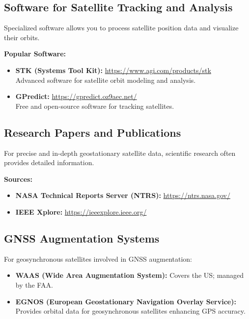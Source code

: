 \subsection{Software for Satellite Tracking and Analysis}
Specialized software allows you to process satellite position data and visualize their orbits.

\textbf{Popular Software:}
\begin{itemize}
    \item \textbf{STK (Systems Tool Kit):} \href{https://www.agi.com/products/stk}{https://www.agi.com/products/stk} \\
    Advanced software for satellite orbit modeling and analysis.
    \item \textbf{GPredict:} \href{https://gpredict.oz9aec.net/}{https://gpredict.oz9aec.net/} \\
    Free and open-source software for tracking satellites.
\end{itemize}

\subsection{Research Papers and Publications}
For precise and in-depth geostationary satellite data, scientific research often provides detailed information.

\textbf{Sources:}
\begin{itemize}
    \item \textbf{NASA Technical Reports Server (NTRS):} \href{https://ntrs.nasa.gov/}{https://ntrs.nasa.gov/}
    \item \textbf{IEEE Xplore:} \href{https://ieeexplore.ieee.org/}{https://ieeexplore.ieee.org/}
\end{itemize}

\subsection{GNSS Augmentation Systems}
For geosynchronous satellites involved in GNSS augmentation:

\begin{itemize}
    \item \textbf{WAAS (Wide Area Augmentation System):} Covers the US; managed by the FAA.
    \item \textbf{EGNOS (European Geostationary Navigation Overlay Service):} Provides orbital data for geosynchronous satellites enhancing GPS accuracy.
\end{itemize}

